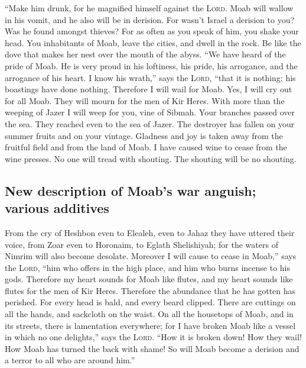  ``Make him drunk, for he magnified himself against the
\textsc{Lord}. Moab will wallow in his vomit, and he also will be in
derision.  For wasn't Israel a derision to you? Was he
found amongst thieves? For as often as you speak of him, you shake your
head.  You inhabitants of Moab, leave the cities, and
dwell in the rock. Be like the dove that makes her nest over the mouth
of the abyss.  ``We have heard of the pride of Moab. He
is very proud in his loftiness, his pride, his arrogance, and the
arrogance of his heart.  I know his wrath,'' says the
\textsc{Lord}, ``that it is nothing; his boastings have done nothing.
 Therefore I will wail for Moab. Yes, I will cry out for
all Moab. They will mourn for the men of Kir Heres.  With
more than the weeping of Jazer I will weep for you, vine of Sibmah. Your
branches passed over the sea. They reached even to the sea of Jazer. The
destroyer has fallen on your summer fruits and on your vintage.
 Gladness and joy is taken away from the fruitful field
and from the land of Moab. I have caused wine to cease from the wine
presses. No one will tread with shouting. The shouting will be no
shouting.

\hypertarget{new-description-of-moabs-war-anguish-various-additives}{%
\subsection{New description of Moab's war anguish; various
additives}\label{new-description-of-moabs-war-anguish-various-additives}}

 From the cry of Heshbon even to Elealeh, even to Jahaz
they have uttered their voice, from Zoar even to Horonaim, to Eglath
Shelishiyah; for the waters of Nimrim will also become desolate.
 Moreover I will cause to cease in Moab,'' says the
\textsc{Lord}, ``him who offers in the high place, and him who burns
incense to his gods.  Therefore my heart sounds for Moab
like flutes, and my heart sounds like flutes for the men of Kir Heres.
Therefore the abundance that he has gotten has perished. 
For every head is bald, and every beard clipped. There are cuttings on
all the hands, and sackcloth on the waist.  On all the
housetops of Moab, and in its streets, there is lamentation everywhere;
for I have broken Moab like a vessel in which no one delights,'' says
the \textsc{Lord}.  ``How it is broken down! How they
wail! How Moab has turned the back with shame! So will Moab become a
derision and a terror to all who are around him.''

